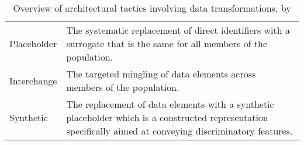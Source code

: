 \begin{table}[H]
\begin{center}
\begin{tabulary}{\textwidth}{p{0.17\textwidth}p{0.83\textwidth}}
Placeholder          & The systematic replacement of direct identifiers with a surrogate that is the same for all members of the population.                                                         \\
Interchange          & The targeted mingling of data elements across members of the population.                                                                                                      \\
Synthetic            & The replacement of data elements with a synthetic placeholder which is a constructed representation specifically aimed at conveying discriminatory features.                 
\end{tabulary}
\caption{Overview of architectural tactics involving data transformations, by \citet{de-id-taxonomy}}
\label{table:de-id-taxonomy}
\end{center}
\end{table}